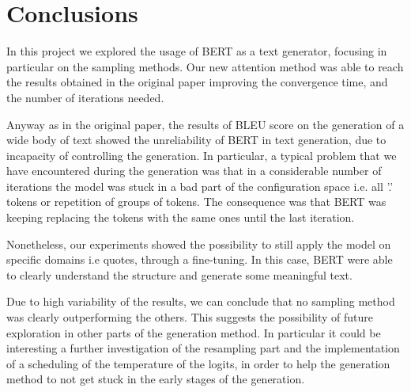 \documentclass[10pt,twocolumn,letterpaper]{article}
\begin{document}
\section{Conclusions}
In this project we explored the usage of BERT as a text generator,
focusing in particular on the sampling methods.
Our new attention method was able to reach the results obtained in the original paper
improving the convergence time, and the number of iterations needed.

Anyway as in the original paper, the results of BLEU score on the generation of a wide body of text
showed the unreliability of BERT in text generation, due to incapacity of controlling the generation.
In particular, a typical problem that we have encountered during the generation was that in
a considerable number of iterations the model was stuck in a bad part of the
configuration space i.e. all '.' tokens or repetition of groups of tokens.
The consequence was that BERT was keeping replacing the tokens with the same ones until the last iteration.

Nonetheless, our experiments showed the possibility to still apply the model
on specific domains i.e quotes, through a fine-tuning.
In this case, BERT were able to clearly understand
the structure and generate some meaningful text.

Due to high variability of the results, we can conclude that no sampling method was clearly
outperforming the others. This suggests the possibility of future exploration in other parts
of the generation method. In particular it could be interesting a further investigation
of the resampling part and the implementation of a scheduling of the temperature of the logits,
in order to help the generation method to not get stuck in the early stages of the generation.


\end{document}
